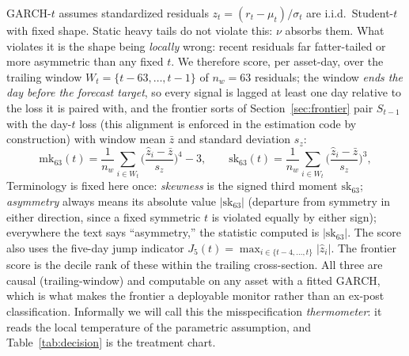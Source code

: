 \documentclass[11pt]{article}
\theoremstyle{remark}
\begin{document}
GARCH-$t$ assumes standardized residuals $z_t = (r_t - \mu_t)/\sigma_t$
are i.i.d.\ Student-$t$ with fixed shape. Static heavy tails do not violate this: $\nu$ absorbs them. What violates it is the shape being
\emph{locally} wrong: recent residuals far fatter-tailed or more
asymmetric than any fixed $t$. We therefore score, per asset-day, over
the trailing window $W_t = \{t-63,\dots,t-1\}$ of $n_w = 63$ residuals; the window \emph{ends the day before the forecast target}, so every signal is lagged at least one day relative to the loss it is paired with, and the frontier sorts of Section~\ref{sec:frontier} pair $S_{t-1}$ with the day-$t$ loss (this alignment is enforced in the estimation code by construction)
with window mean $\bar{z}$ and standard deviation $s_z$:
\begin{equation}
\mathrm{mk}_{63}(t) = \frac{1}{n_w}\sum_{i\in W_t}
\Big(\frac{\widehat{z}_i - \bar{z}}{s_z}\Big)^{4} - 3,
\qquad
\mathrm{sk}_{63}(t) = \frac{1}{n_w}\sum_{i\in W_t}
\Big(\frac{\widehat{z}_i - \bar{z}}{s_z}\Big)^{3},
\label{eq:score}
\end{equation}
Terminology is fixed here once: \emph{skewness} is the signed third
moment $\mathrm{sk}_{63}$; \emph{asymmetry} always means its absolute
value $|\mathrm{sk}_{63}|$ (departure from symmetry in either
direction, since a fixed symmetric $t$ is violated equally by either
sign); everywhere the text says ``asymmetry,'' the statistic computed
is $|\mathrm{sk}_{63}|$. The score also uses the five-day jump indicator
$J_5(t) = \max_{i \in \{t-4,\dots,t\}} |\widehat{z}_i|$. The frontier
score is the decile rank of these within the trailing cross-section.
All three are causal (trailing-window) and computable on any asset with a fitted GARCH, which is what makes the frontier a deployable monitor
rather than an ex-post classification. Informally we will call this the
misspecification \emph{thermometer}: it reads the local temperature of
the parametric assumption, and Table~\ref{tab:decision} is the treatment
chart.
\end{document}
